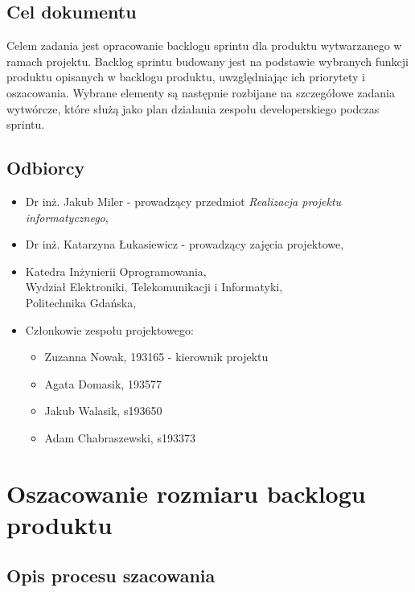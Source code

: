 \documentclass[12pt,a4paper,colorlinks=true,linkcolor=NavyBlue,citecolor=red,urlcolor=NavyBlue]{book}
\begin{document}
\section{Cel dokumentu}
Celem zadania jest opracowanie backlogu sprintu dla produktu wytwarzanego w ramach projektu. Backlog sprintu budowany jest na podstawie wybranych funkcji produktu opisanych w backlogu produktu, uwzględniając ich priorytety i oszacowania. Wybrane elementy są następnie rozbijane na szczegółowe zadania wytwórcze, które służą jako plan działania zespołu developerskiego podczas sprintu.

\section{Odbiorcy}

\begin{itemize}
    \item Dr inż. Jakub Miler - prowadzący przedmiot \textit{Realizacja projektu informatycznego},
    \item Dr inż. Katarzyna Łukasiewicz - prowadzący zajęcia projektowe,
    \item Katedra Inżynierii Oprogramowania, \\[2mm] 
Wydział Elektroniki, Telekomunikacji i Informatyki, \\[2mm]  
Politechnika Gdańska,
    \item Członkowie zespołu projektowego:
    \begin{itemize}
        \item[] Zuzanna Nowak, 193165 - kierownik projektu
        \item[] Agata Domasik, 193577
        \item[] Jakub Walasik, s193650
        \item[] Adam Chabraszewski, s193373
    \end{itemize}
\end{itemize}

\clearpage


\chapter{Oszacowanie rozmiaru backlogu produktu}

\section{Opis procesu szacowania}
\end{document}
